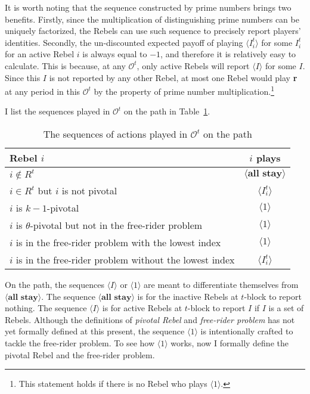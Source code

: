 \documentclass[12pt,letter]{article}
\newcommand{\Omicron}{\mathcal{O}}
\theoremstyle{definition}
\theoremstyle{remark}
\theoremstyle{claim}
\begin{document}
It is worth noting that the sequence constructed by prime numbers brings two benefits. Firstly, since the multiplication of distinguishing prime numbers can be uniquely factorized, the Rebels can use such sequence to precisely report players' identities. Secondly, the un-discounted expected payoff of playing $\langle I^t_i \rangle$ for some $I^t_i$ for an active Rebel $i$ is always equal to $-1$, and therefore it is relatively easy to calculate. This is because, at any $\Omicron^{t}$, only active Rebels will report $\langle I \rangle$ for some $I$. Since this $I$ is not reported by any other Rebel, at most one Rebel would play \textbf{r} at any period in this $\Omicron^{t}$ by the property of prime number multiplication.\footnote{This statement holds if there is no Rebel who plays $\langle 1 \rangle$.} 

I list the sequences played in $\Omicron^t$ on the path in Table~\ref{Table_msg_RP_path}.

\begin{table}[!htbp]
\caption{The sequences of actions played in $\Omicron^t$ on the path}
\label{Table_msg_RP_path}
\begin{center}
\begin{tabular}{l c}
Rebel $i$ & $i$ plays\\
\hline
\hline
$i\notin R^t$				& $\langle \textbf{all stay} \rangle$  \\
$i\in R^t$ but $i$ is not pivotal	 					 			& $\langle I^t_i \rangle$  \\
$i$ is $k-1$-pivotal	 					 			& $\langle 1 \rangle$  \\
$i$ is $\theta$-pivotal but not in the free-rider problem	 					 			& $\langle 1 \rangle$  \\
$i$ is in the free-rider problem with the lowest index	 					 			& $\langle 1 \rangle$  \\
$i$ is in the free-rider problem without the lowest index	 					 			& $\langle I^t_i \rangle$  \\
\hline
\end{tabular}
\end{center}
\end{table}

On the path, the sequences $\langle I \rangle$ or $\langle 1 \rangle$ are meant to differentiate themselves from $\langle \textbf{all stay} \rangle$. The sequence $\langle \textbf{all stay} \rangle$ is for the inactive Rebels at $t$-block to report nothing. The sequence $\langle I \rangle$ is for active Rebels at $t$-block to report $I$ if $I$ is a set of Rebels. Although the definitions of \textit{pivotal Rebel} and \textit{free-rider problem} has not yet formally defined at this present, the sequence $\langle 1 \rangle$ is intentionally crafted to tackle the free-rider problem. To see how $\langle 1 \rangle$ works, now I formally define the {pivotal Rebel} and the {free-rider problem}. 
\end{document}
